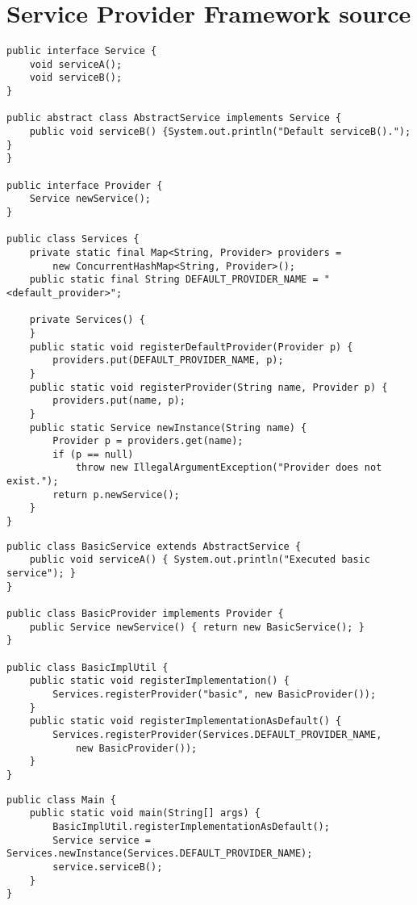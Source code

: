 \appendix
\chapter{Service Provider Framework source}
\label{examplesource}

\begin{lstlisting}[caption=Classes of the \code{service} package]
public interface Service {
	void serviceA();
	void serviceB();
}

public abstract class AbstractService implements Service {
	public void serviceB() {System.out.println("Default serviceB()."); }
}

public interface Provider {
	Service newService();
}

public class Services {
	private static final Map<String, Provider> providers = 
		new ConcurrentHashMap<String, Provider>();
	public static final String DEFAULT_PROVIDER_NAME = "<default_provider>";
	
	private Services() {
	}
	public static void registerDefaultProvider(Provider p) { 
		providers.put(DEFAULT_PROVIDER_NAME, p); 
	}
	public static void registerProvider(String name, Provider p) { 
		providers.put(name, p); 
	}
	public static Service newInstance(String name) {
		Provider p = providers.get(name);
		if (p == null) 
			throw new IllegalArgumentException("Provider does not exist.");
		return p.newService();
	}
}
\end{lstlisting}

\begin{lstlisting}[caption=Classes of the \code{impl} package]
public class BasicService extends AbstractService {
	public void serviceA() { System.out.println("Executed basic service"); }
} 

public class BasicProvider implements Provider {
	public Service newService() { return new BasicService(); }
}

public class BasicImplUtil {
	public static void registerImplementation() { 
		Services.registerProvider("basic", new BasicProvider()); 
	}
	public static void registerImplementationAsDefault() { 
		Services.registerProvider(Services.DEFAULT_PROVIDER_NAME, 
			new BasicProvider()); 
	}
}
\end{lstlisting}

\begin{lstlisting}[caption=Classes of the \code{client} package]
public class Main {
	public static void main(String[] args) {
		BasicImplUtil.registerImplementationAsDefault();
		Service service = Services.newInstance(Services.DEFAULT_PROVIDER_NAME);
		service.serviceB();
	}
}
\end{lstlisting}
